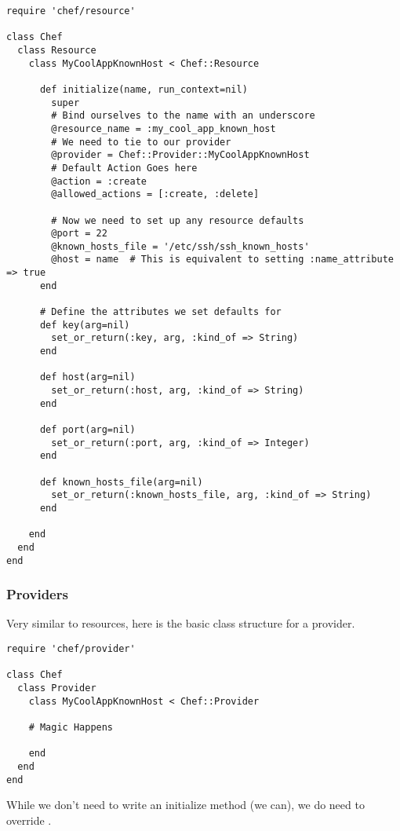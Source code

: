 \begin{lstlisting}[label=lst:cookbook-hwrp3]
require 'chef/resource'

class Chef
  class Resource
    class MyCoolAppKnownHost < Chef::Resource

      def initialize(name, run_context=nil)
        super
        # Bind ourselves to the name with an underscore
        @resource_name = :my_cool_app_known_host
        # We need to tie to our provider
        @provider = Chef::Provider::MyCoolAppKnownHost
        # Default Action Goes here
        @action = :create
        @allowed_actions = [:create, :delete]

        # Now we need to set up any resource defaults
        @port = 22
        @known_hosts_file = '/etc/ssh/ssh_known_hosts'
        @host = name  # This is equivalent to setting :name_attribute => true
      end

      # Define the attributes we set defaults for
      def key(arg=nil)
        set_or_return(:key, arg, :kind_of => String)
      end

      def host(arg=nil)
        set_or_return(:host, arg, :kind_of => String)
      end

      def port(arg=nil)
        set_or_return(:port, arg, :kind_of => Integer)
      end

      def known_hosts_file(arg=nil)
        set_or_return(:known_hosts_file, arg, :kind_of => String)
      end

    end
  end
end
\end{lstlisting}

\subsubsection{Providers}

Very similar to resources, here is the basic class structure for a provider.

\begin{lstlisting}[label=lst:cookbook-hwrp4]
require 'chef/provider'

class Chef
  class Provider
    class MyCoolAppKnownHost < Chef::Provider

    # Magic Happens

    end
  end
end
\end{lstlisting}

While we don’t need to write an initialize method (we can), we do need to override .

